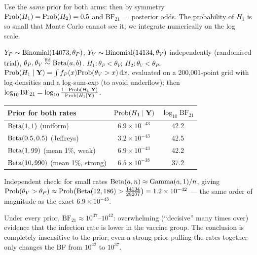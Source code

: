 \documentclass[11pt]{article}
\begin{document}
\begin{keyidea}
Use the \emph{same} prior for both arms: then by symmetry $\mathrm{Prob}(H_1)=\mathrm{Prob}(H_2)=0.5$ and $\text{BF}_{21}=$ posterior odds. The probability of $H_1$ is so small that Monte Carlo cannot see it; we integrate numerically on the log scale.
\end{keyidea}

\solution
{} $Y_P\sim\mathrm{Binomial}(14073,\theta_P)$, $Y_V\sim\mathrm{Binomial}(14134,\theta_V)$ independently (randomised trial), $\theta_P,\theta_V\stackrel{\text{iid}}{\sim}\mathrm{Beta}(a,b)$. $H_1:\theta_P<\theta_V$; $H_2:\theta_V<\theta_P$.
 $\mathrm{Prob}(H_1\mid\mathbf Y)=\int f_P(x)\mathrm{Prob}(\theta_V>x)\,\mathrm{d} x$, evaluated on a 200{,}001-point grid with log-densities and a log-sum-exp (to avoid underflow); then $\log_{10}\text{BF}_{21}=\log_{10}\frac{1-\mathrm{Prob}(H_1\mid\mathbf Y)}{\mathrm{Prob}(H_1\mid\mathbf Y)}$.
\begin{center}
\begin{tabular}{lcc}\toprule
Prior for both rates & $\mathrm{Prob}(H_1\mid\mathbf Y)$ & $\log_{10}\text{BF}_{21}$\\\midrule
$\mathrm{Beta}(1,1)$ (uniform) & $6.9\times10^{-43}$ & 42.2\\
$\mathrm{Beta}(0.5,0.5)$ (Jeffreys) & $3.2\times10^{-43}$ & 42.5\\
$\mathrm{Beta}(1,99)$ (mean 1\%, weak) & $6.9\times10^{-43}$ & 42.2\\
$\mathrm{Beta}(10,990)$ (mean 1\%, strong) & $6.5\times10^{-38}$ & 37.2\\\bottomrule
\end{tabular}
\end{center}

\begin{sanity}
Independent check: for small rates $\mathrm{Beta}(a,n)\approx\mathrm{Gamma}(a,1)/n$, giving $\mathrm{Prob}(\theta_V>\theta_P)\approx\mathrm{Prob}\big(\mathrm{Beta}(12,186)>\tfrac{14134}{28207}\big)=1.2\times10^{-42}$ --- the same order of magnitude as the exact $6.9\times10^{-43}$. \checkmark
\end{sanity}

\begin{answer}
Under every prior, $\text{BF}_{21}\approx10^{37}$--$10^{42}$: overwhelming (``decisive'' many times over) evidence that the infection rate is lower in the vaccine group. The conclusion is completely insensitive to the prior; even a strong prior pulling the rates together only changes the BF from $10^{42}$ to $10^{37}$.
\end{answer}
\end{document}
